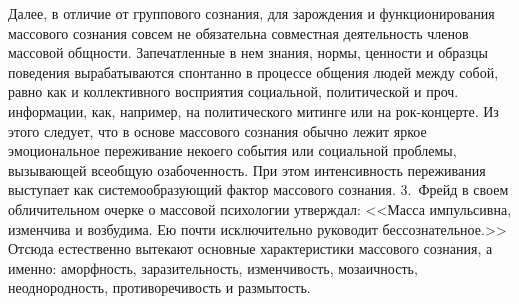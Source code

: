 Далее, в отличие от группового сознания, для зарождения и функционирования массового сознания совсем не
обязательна совместная деятельность членов массовой общности. Запечатленные в нем знания, нормы, ценности и
образцы поведения вырабатываются спонтанно в процессе общения людей между собой, равно как и коллективного
восприятия социальной, политической и проч. информации, как, например, на политического митинге или на рок-концерте.
Из этого следует, что в основе массового сознания обычно лежит яркое эмоциональное переживание некоего
события или социальной проблемы, вызывающей всеобщую озабоченность. При этом интенсивность переживания
выступает как системообразующий фактор массового сознания. 3.~Фрейд в своем обличительном очерке о массовой
психологии утверждал: <<Масса импульсивна, изменчива и возбудима. Ею почти исключительно руководит
бессознательное.>>\autocite{freid_mass} Отсюда естественно вытекают основные характеристики массового сознания,
а именно: аморфность, заразительность, изменчивость, мозаичность, неоднородность, противоречивость и
размытость.\autocite{ashin}\autocite{flier}\autocite{prokudin}\autocite{heveshi}\autocite{hevishi2001tolpa}\autocite{streltsov1970}\autocite{dodonov1999}

